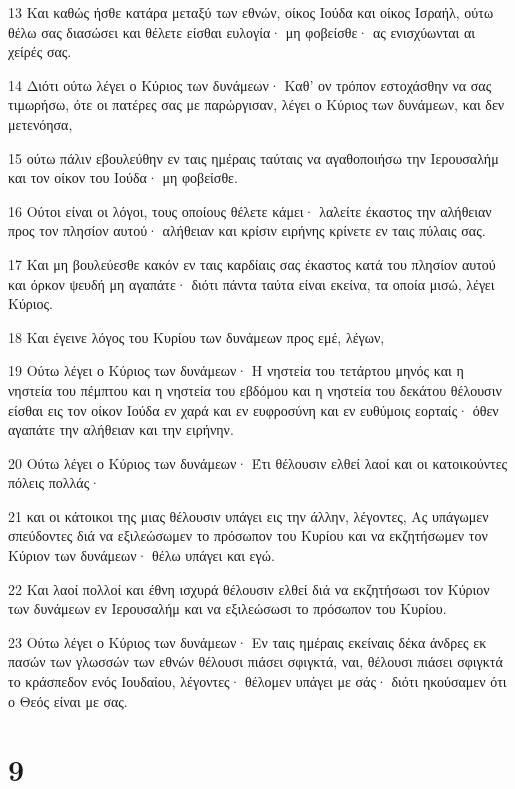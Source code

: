 \par 13 Και καθώς ήσθε κατάρα μεταξύ των εθνών, οίκος Ιούδα και οίκος Ισραήλ, ούτω θέλω σας διασώσει και θέλετε είσθαι ευλογία· μη φοβείσθε· ας ενισχύωνται αι χείρές σας.
\par 14 Διότι ούτω λέγει ο Κύριος των δυνάμεων· Καθ' ον τρόπον εστοχάσθην να σας τιμωρήσω, ότε οι πατέρες σας με παρώργισαν, λέγει ο Κύριος των δυνάμεων, και δεν μετενόησα,
\par 15 ούτω πάλιν εβουλεύθην εν ταις ημέραις ταύταις να αγαθοποιήσω την Ιερουσαλήμ και τον οίκον του Ιούδα· μη φοβείσθε.
\par 16 Ούτοι είναι οι λόγοι, τους οποίους θέλετε κάμει· λαλείτε έκαστος την αλήθειαν προς τον πλησίον αυτού· αλήθειαν και κρίσιν ειρήνης κρίνετε εν ταις πύλαις σας.
\par 17 Και μη βουλεύεσθε κακόν εν ταις καρδίαις σας έκαστος κατά του πλησίον αυτού και όρκον ψευδή μη αγαπάτε· διότι πάντα ταύτα είναι εκείνα, τα οποία μισώ, λέγει Κύριος.
\par 18 Και έγεινε λόγος του Κυρίου των δυνάμεων προς εμέ, λέγων,
\par 19 Ούτω λέγει ο Κύριος των δυνάμεων· Η νηστεία του τετάρτου μηνός και η νηστεία του πέμπτου και η νηστεία του εβδόμου και η νηστεία του δεκάτου θέλουσιν είσθαι εις τον οίκον Ιούδα εν χαρά και εν ευφροσύνη και εν ευθύμοις εορταίς· όθεν αγαπάτε την αλήθειαν και την ειρήνην.
\par 20 Ούτω λέγει ο Κύριος των δυνάμεων· Έτι θέλουσιν ελθεί λαοί και οι κατοικούντες πόλεις πολλάς·
\par 21 και οι κάτοικοι της μιας θέλουσιν υπάγει εις την άλλην, λέγοντες, Ας υπάγωμεν σπεύδοντες διά να εξιλεώσωμεν το πρόσωπον του Κυρίου και να εκζητήσωμεν τον Κύριον των δυνάμεων· θέλω υπάγει και εγώ.
\par 22 Και λαοί πολλοί και έθνη ισχυρά θέλουσιν ελθεί διά να εκζητήσωσι τον Κύριον των δυνάμεων εν Ιερουσαλήμ και να εξιλεώσωσι το πρόσωπον του Κυρίου.
\par 23 Ούτω λέγει ο Κύριος των δυνάμεων· Εν ταις ημέραις εκείναις δέκα άνδρες εκ πασών των γλωσσών των εθνών θέλουσι πιάσει σφιγκτά, ναι, θέλουσι πιάσει σφιγκτά το κράσπεδον ενός Ιουδαίου, λέγοντες· θέλομεν υπάγει με σάς· διότι ηκούσαμεν ότι ο Θεός είναι με σας.

\chapter{9}

